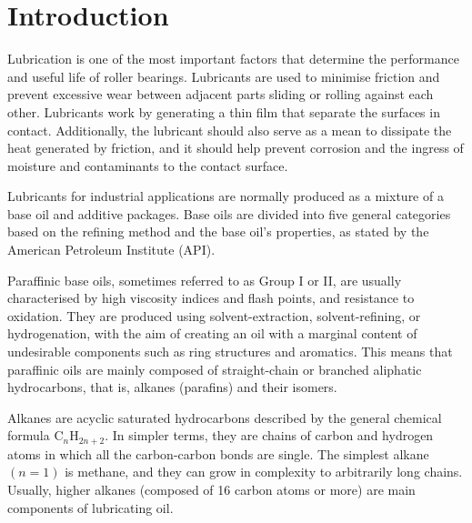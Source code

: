 \documentclass[aps,prb,reprint,superscriptaddress, a4paper]{revtex4-1}
\begin{document}

\section{Introduction}


Lubrication is one of the most important factors  that determine the performance and useful life of roller bearings. Lubricants are used to minimise friction and prevent excessive wear between  adjacent parts sliding or rolling against each other. Lubricants work by generating a thin film that separate the surfaces in contact. Additionally, the lubricant should also serve as a mean to dissipate the heat generated by friction, and  it should help prevent corrosion and the ingress of moisture and contaminants to the contact surface. 

Lubricants for industrial applications are normally produced as a mixture of  a base oil and   additive packages.  Base oils  are divided into five general categories based on the refining method and the base oil's properties, as stated by the American Petroleum Institute (API)\cite{API}.

Paraffinic base oils,  sometimes referred to as  Group I or II, are usually characterised by high viscosity indices and flash points, and  resistance to oxidation. They  are produced using solvent-extraction,  solvent-refining, or hydrogenation, with the aim of creating an oil with  a marginal content of undesirable components such as ring structures and aromatics. This means that paraffinic oils are mainly  composed of straight-chain or branched aliphatic hydrocarbons, that is,  alkanes (parafins) and their isomers.


Alkanes are acyclic saturated hydrocarbons described by the general chemical formula $\text{C}_{n}\text{H}_{2n+2}$. In simpler terms, they are chains of carbon and hydrogen atoms in which all the carbon-carbon bonds are single. The simplest alkane $\left(n=1\right)$ is methane, and they can grow in complexity to arbitrarily long chains. Usually, higher alkanes (composed of 16 carbon atoms or more) are  main components of lubricating oil.
\end{document}
